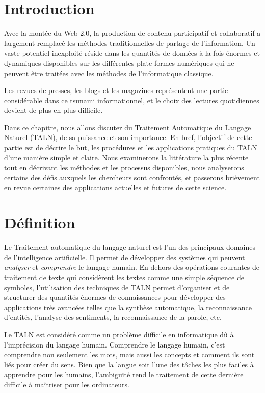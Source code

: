 
\section{Introduction}
Avec la montée du Web 2.0, la production de contenu participatif et collaboratif a largement remplacé les méthodes traditionnelles de partage de l'information. Un vaste potentiel inexploité réside dans les quantités de données à la fois énormes et dynamiques disponibles sur les différentes plate-formes numériques qui ne peuvent être traitées avec les méthodes de l'informatique classique.

Les revues de presses, les blogs et les magazines représentent une partie considérable dans ce tsunami informationnel, et le choix des lectures quotidiennes devient de plus en plus difficile.

Dans ce chapitre, nous allons discuter du Traitement Automatique du Langage Naturel (TALN), de sa puissance et son importance. En bref, l'objectif de cette partie est de décrire le but, les procédures et les applications pratiques du TALN d'une manière simple et claire. Nous examinerons la littérature la plus récente tout en décrivant les méthodes et les processus disponibles, nous analyserons certains des défis auxquels les chercheurs sont confrontés, et passerons brièvement en revue certaines des applications actuelles et futures de cette science.

\newpage
\section{Définition}
Le Traitement automatique du langage naturel est l'un des principaux domaines de l'intelligence artificielle. Il permet de développer des systèmes qui peuvent \emph{analyser} et \emph{comprendre} le langage humain. En dehors des opérations courantes de traitement de texte qui considèrent les textes comme une simple séquence de symboles, l'utilisation des techniques de TALN permet d'organiser et de structurer des quantités énormes de connaissances pour développer des applications très avancées telles que la synthèse automatique, la reconnaissance d'entités, l'analyse des sentiments, la reconnaissance de la parole, etc.

Le TALN est considéré comme un problème difficile en informatique dû à l'imprécision du langage humain. Comprendre le langage humain, c'est comprendre non seulement les mots, mais aussi les concepts et comment ils sont liés pour créer du sens. Bien que la langue soit l'une des tâches les plus faciles à apprendre pour les humains, l'ambiguïté rend le traitement de cette dernière difficile à maîtriser pour les ordinateurs.

